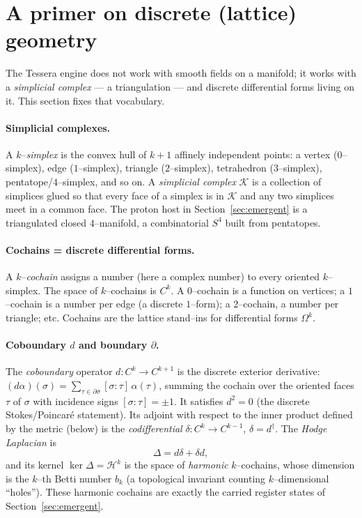 \documentclass[11pt,oneside]{article}
\begin{document}
\section{A primer on discrete (lattice) geometry}
\label{sec:lattice}

The Tessera engine does not work with smooth fields on a manifold; it works
with a \emph{simplicial complex} --- a triangulation --- and discrete
differential forms living on it. This section fixes that vocabulary.

\paragraph{Simplicial complexes.}
A $k$--\emph{simplex} is the convex hull of $k+1$ affinely independent points:
a vertex ($0$--simplex), edge ($1$--simplex), triangle ($2$--simplex),
tetrahedron ($3$--simplex), pentatope/$4$--simplex, and so on. A
\emph{simplicial complex} $\mathcal K$ is a collection of simplices glued so
that every face of a simplex is in $\mathcal K$ and any two simplices meet in a
common face. The proton host in Section~\ref{sec:emergent} is a triangulated
closed $4$--manifold, a combinatorial $S^4$ built from pentatopes.

\paragraph{Cochains = discrete differential forms.}
A $k$--\emph{cochain} assigns a number (here a complex number) to every oriented
$k$--simplex. The space of $k$--cochains is $C^k$. A $0$--cochain is a function
on vertices; a $1$--cochain is a number per edge (a discrete $1$--form); a
$2$--cochain, a number per triangle; etc. Cochains are the lattice stand--ins
for differential forms $\Omega^k$.

\paragraph{Coboundary $d$ and boundary $\partial$.}
The \emph{coboundary} operator $d:C^k\to C^{k+1}$ is the discrete exterior
derivative: $(d\alpha)(\sigma) = \sum_{\tau\in\partial\sigma} [\sigma:\tau]\,
\alpha(\tau)$, summing the cochain over the oriented faces $\tau$ of $\sigma$
with incidence signs $[\sigma:\tau]=\pm1$. It satisfies $d^2=0$ (the discrete
Stokes/Poincar\'e statement). Its adjoint with respect to the inner product
defined by the metric (below) is the \emph{codifferential}
$\delta:C^k\to C^{k-1}$, $\delta = d^\dagger$. The \emph{Hodge Laplacian} is
\begin{equation}
  \Delta = d\delta + \delta d ,
\end{equation}
and its kernel $\ker\Delta = \mathcal H^k$ is the space of \emph{harmonic}
$k$--cochains, whose dimension is the $k$--th Betti number $b_k$ (a topological
invariant counting $k$--dimensional ``holes''). These harmonic cochains are
exactly the carried register states of Section~\ref{sec:emergent}.
\end{document}
